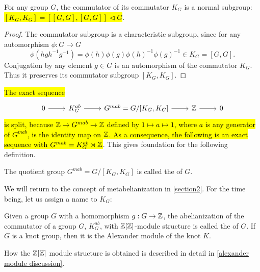 \begin{lemma}
  For any group $G$, the commutator of its commutator $K_G$ is a normal subgroup: \hl{$[K_G, K_G]=[[G, G], [G, G]]\triangleleft G$}. 
\end{lemma}

\begin{proof}
  The commutator subgroup is a characteristic subgroup, since for any automorphism $\phi:G\to G$ 
  $$\phi(hgh^{-1}g^{-1})=\phi(h)\phi(g)\phi(h)^{-1}\phi(g)^{-1}\in K_G=[G, G].$$
  Conjugation by any element $g\in G$ is an automorphism of the commutator $K_G$. Thus it preserves its commutator subgroup $[K_G, K_G]$. 
\end{proof}

\hl{The exact sequence}
\begin{equation}\label{split sequence metab}
  \begin{tikzcd}
    0\arrow[r] & K_G^{ab} \arrow[r] & G^{mab}=G/[K_G, K_G]\arrow[r] & \Z \arrow[r] & 0
  \end{tikzcd}
\end{equation}
\hl{is split, because $\operatorname{\mathbb{Z}}\to G^{mab}\to\operatorname{\mathbb{Z}}$ defined by $1\mapsto a\mapsto 1$, where $a$ is any generator of $G^{mab}$, is the identity map on $\operatorname{\mathbb{Z}}$. As a consequence, the following is an exact sequence with $G^{mab}=K^{ab}_G \rtimes \operatorname{\mathbb{Z}}$}. This gives foundation for the following definition.


\begin{definition}[metabelianization]\label{def:metabelianization}
  The quotient group $G^{mab}=G/[K_G, K_G]$ is called the  of $G$. 
\end{definition}

We will return to the concept of metabelianization in \cref{section2}. For the time being, let us assign a name to $K_G$:

\begin{definition}\label{alexander module def}
  Given a group $G$ with a homomorphism $g:G\to \operatorname{\mathbb{Z}}$, the abelianization of the commutator of a group $G$, $K_G^{ab}$, with $\operatorname{\mathbb{Z}}[\operatorname{\mathbb{Z}}]$-module structure is called the  of $G$. If $G$ is a knot group, then it is the Alexander module of the knot $K$.
\end{definition}

How the $\operatorname{\mathbb{Z}}[\operatorname{\mathbb{Z}}]$ module structure is obtained is described in detail in \cref{alexander module discussion}.




